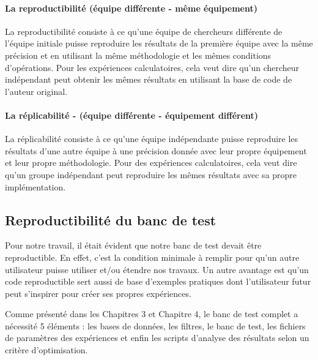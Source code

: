 \paragraph{La reproductibilité (équipe différente - même équipement)}

La reproductibilité consiste à ce qu'une équipe de chercheurs différente de l'équipe initiale puisse reproduire les résultats de la première équipe avec la même précision et en utilisant la même méthodologie et les mêmes conditions d'opérations. Pour les expériences calculatoires, cela veut dire qu'un chercheur indépendant peut obtenir les mêmes résultats en utilisant la base de code de l'auteur original.

\paragraph{La réplicabilité - (équipe différente - équipement différent) }

La réplicabilité consiste à ce qu'une équipe indépendante puisse reproduire les résultats d'une autre équipe à une précision donnée avec leur propre équipement et leur propre méthodologie. Pour des expériences calculatoires, cela veut dire qu'un groupe indépendant peut reproduire les mêmes résultats avec sa propre implémentation.

\subsection{Reproductibilité du banc de test}

Pour notre travail, il était évident que notre banc de test devait être reproductible. En effet, c'est la condition minimale à remplir pour qu'un autre utilisateur puisse utiliser et/ou étendre nos travaux. Un autre avantage est qu'un code reproductible sert aussi de base d'exemples pratiques dont l'utilisateur futur peut s'inspirer pour créer ses propres expériences.

Comme présenté dans les Chapitres 3 et Chapitre 4, le banc de test complet a nécessité 5 éléments : les bases de données, les filtres, le banc de test, les fichiers de paramètres des expériences et enfin les scripts d'analyse des résultats selon un critère d'optimisation.

